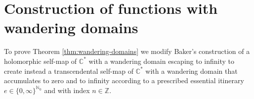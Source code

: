 \documentclass[a4paper, 12pt, reqno]{amsart}
\numberwithin{equation}{section}
\newcommand{\red}[1]{{\color{red} #1}}
\theoremstyle{plain}
\theoremstyle{definition}
\theoremstyle{remark}
\newcommand{\C}{{\mathbb{C}}}
\newcommand{\Z}{{\mathbb{Z}}}
\newcommand{\N}{{\mathbb{N}}}
\begin{document}
\section{Construction of functions with wandering domains}

\label{sec:wd}


To prove Theorem \ref{thm:wandering-domains} we modify Baker's construction of a holomorphic self-map of $\C^*$ with a wandering domain escaping to infinity \cite[Theorem 4]{baker87} to create instead a transcendental self-map of $\C^*$ with a wandering domain that accumulates to zero and to infinity according to a prescribed essential itinerary $e\in\{0,\infty\}^{\N_0}$ and with index $n\in \Z$.
\end{document}
